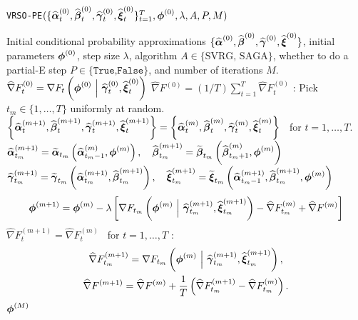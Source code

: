 \begin{algorithm}
\caption{\texttt{VRSO-PE}$(\{\widehat {\boldsymbol{\alpha}}_t^{(0)}, \widehat {\boldsymbol{\beta}}_t^{(0)}, \widehat {\boldsymbol{\gamma}}_t^{(0)}, \widehat {\boldsymbol{\xi}}_t^{(0)}\}_{t=1}^T,\boldsymbol{\phi}^{(0)},\lambda,A,P,M)$}\label{alg:VRSO-PE}
\begin{algorithmic}[1]
\Require Initial conditional probability approximations $\{\widehat {\boldsymbol{\alpha}}^{(0)}, \widehat {\boldsymbol{\beta}}^{(0)}, \widehat {\boldsymbol{\gamma}}^{(0)}, \widehat {\boldsymbol{\xi}}^{(0)}\}$, initial parameters $\boldsymbol{\phi}^{(0)}$, step size $\lambda$, algorithm $A \in \{\text{SVRG, SAGA}\}$, whether to do a partial-E step $P \in \{\texttt{True,False}\}$, and number of iterations $M$.
%
 
    \State $\widehat \nabla F^{(0)}_{t} = \nabla F_t\left(\boldsymbol{\phi}^{(0)} ~ \Big | ~ \widehat {\boldsymbol{\gamma}}^{(0)}_{t}, \widehat {\boldsymbol{\xi}}^{(0)}_{t}\right)$ 
\EndFor
\State $\widehat \nabla F^{(0)} = (1/T) \sum_{t=1}^T \widehat \nabla F^{(0)}_{t}$
%
:
    \State Pick $t_m \in \{1,\ldots,T\}$ uniformly at random.
    \State $\left\{\widehat {\boldsymbol{\alpha}}^{(m+1)}_t, \widehat {\boldsymbol{\beta}}^{(m+1)}_t, \widehat {\boldsymbol{\gamma}}^{(m+1)}_t, \widehat {\boldsymbol{\xi}}^{(m+1)}_t\right\} = \left\{\widehat {\boldsymbol{\alpha}}^{(m)}_{t}, \widehat {\boldsymbol{\beta}}^{(m)}_{t}, \widehat {\boldsymbol{\gamma}}^{(m)}_{t}, \widehat {\boldsymbol{\xi}}^{(m)}_{t}\right\} \enspace$ for $t = 1,\ldots,T$.
     
    \State $\widehat {\boldsymbol{\alpha}}_{t_m}^{(m+1)} = \widetilde {\boldsymbol{\alpha}}_{t_m}\left(\widehat {\boldsymbol{\alpha}}_{t_m-1}^{(m)},\boldsymbol{\phi}^{(m)}\right), \quad \widehat {\boldsymbol{\beta}}_{t_m}^{(m+1)} = \widetilde {\boldsymbol{\beta}}_{t_m}\left(\widehat {\boldsymbol{\beta}}_{t_m+1}^{(m)},\boldsymbol{\phi}^{(m)}\right)$ 
    \State $\widehat {\boldsymbol{\gamma}}_{t_m}^{(m+1)} = \widetilde {\boldsymbol{\gamma}}_{t_m}\left(\widehat {\boldsymbol{\alpha}}_{t_m}^{(m+1)},\widehat {\boldsymbol{\beta}}_{t_m}^{(m+1)}\right), 
    \quad \widehat {\boldsymbol{\xi}}_{t_m}^{(m+1)} = \widetilde {\boldsymbol{\xi}}_{t_m}\left(\widehat {\boldsymbol{\alpha}}_{t_m-1}^{(m+1)},\widehat {\boldsymbol{\beta}}_{t_m}^{(m+1)},\boldsymbol{\phi}^{(m)}\right)$
    \EndIf
    \State {}
    \begin{gather}
        \boldsymbol{\phi}^{(m+1)} = \boldsymbol{\phi}^{(m)} - \lambda \left[\nabla F_{t_m}\left(\boldsymbol{\phi}^{(m)} ~ \Big | ~ \widehat {\boldsymbol{\gamma}}_{t_m}^{(m+1)}, \widehat {\boldsymbol{\xi}}_{t_m}^{(m+1)}\right) - \widehat \nabla F^{(m)}_{t_m} + \widehat \nabla F^{(m)} \right]
    \end{gather}
    \State $\widehat \nabla F_{t}^{(m+1)} = \widehat \nabla F_{t}^{(m)} \enspace$ for $t = 1,\ldots,T$ 
    :
        \begin{gather}
            \widehat \nabla F_{t_m}^{(m+1)} = \nabla F_{t_m}\left(\boldsymbol{\phi}^{(m)} ~ \Big | ~ \widehat {\boldsymbol{\gamma}}_{t_m}^{(m+1)}, \widehat {\boldsymbol{\xi}}_{t_m}^{(m+1)}\right), \\
            \widehat \nabla F^{(m+1)} = \widehat \nabla F^{(m)} + \frac{1}{T} \left( \widehat \nabla F_{t_m}^{(m+1)} - \widehat \nabla F_{t_m}^{(m)}\right).
        \end{gather}
    \EndIf
\EndFor
\State \Return $\boldsymbol{\phi}^{(M)}$
\end{algorithmic}
\end{algorithm}

